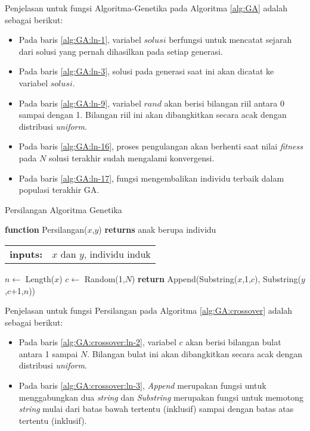 Penjelasan untuk fungsi  Algoritma-Genetika pada Algoritma \ref{alg:GA} adalah sebagai berikut:
\begin{itemize}
	\item Pada baris \ref{alg:GA:ln-1}, variabel $solusi$ berfungsi untuk mencatat sejarah dari solusi yang pernah dihasilkan pada setiap generasi.
	\item Pada baris \ref{alg:GA:ln-3}, solusi pada generasi saat ini akan dicatat ke variabel $solusi$.
	\item Pada baris \ref{alg:GA:ln-9}, variabel $rand$ akan berisi bilangan riil antara 0 sampai dengan 1. Bilangan riil ini akan dibangkitkan secara acak dengan distribusi \textit{uniform}.
	\item Pada baris \ref{alg:GA:ln-16}, proses pengulangan akan berhenti saat nilai \textit{fitness} pada $N$ solusi terakhir sudah mengalami konvergensi.
	\item Pada baris \ref{alg:GA:ln-17}, fungsi mengembalikan individu terbaik dalam populasi terakhir GA.
\end{itemize}

\begin{algorithm}[H]
	\caption{Persilangan Algoritma Genetika}
	\label{alg:GA:crossover}
	\begin{flushleft}
		\textbf{function} Persilangan($x$,$y$) \textbf{returns} anak berupa individu
		\begin{flushleft}
			\begin{tabular}{ l l }
				\textbf{inputs:}& $x$ dan $y$, individu induk
				\hspace{5pt} 
			\end{tabular} 
		\end{flushleft}
	\end{flushleft}

	\begin{algorithmic}[1]
		\STATE $n \leftarrow$ Length($x$) \label{alg:GA:crossover:ln-1}
		\STATE $c \leftarrow$ Random(1,$N$) \label{alg:GA:crossover:ln-2}
		\STATE \textbf{return} Append(Substring($x$,1,$c$), Substring($y$,$c$+1,$n$)) \label{alg:GA:crossover:ln-3}
	\end{algorithmic}
\end{algorithm}

Penjelasan untuk fungsi Persilangan pada Algoritma \ref{alg:GA:crossover} adalah sebagai berikut:
\begin{itemize}
	\item Pada baris \ref{alg:GA:crossover:ln-2}, variabel $c$ akan berisi bilangan bulat antara 1 sampai $N$. Bilangan bulat ini akan dibangkitkan secara acak dengan distribusi \textit{uniform}.
	\item Pada baris \ref{alg:GA:crossover:ln-3}, \textit{Append} merupakan fungsi untuk menggabungkan dua \textit{string} dan \textit{Substring} merupakan fungsi untuk memotong \textit{string} mulai dari batas bawah tertentu (inklusif) sampai dengan batas atas tertentu (inklusif).
\end{itemize}

